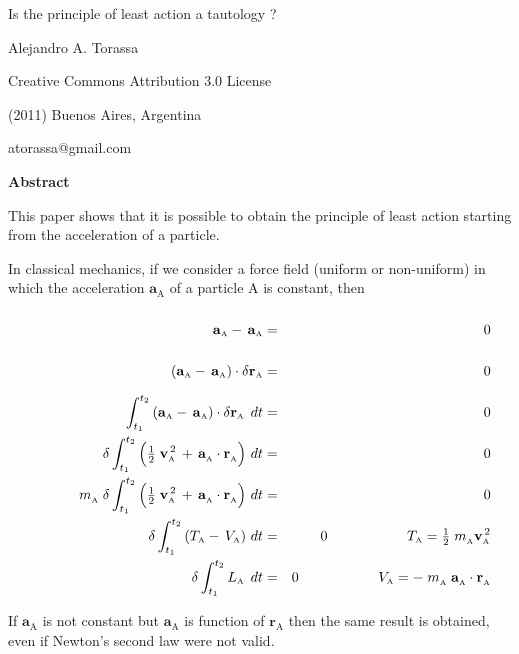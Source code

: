 \documentclass[12pt]{article}
\newcommand{\mM}{m}
\newcommand{\mT}{T}
\newcommand{\mV}{V}
\newcommand{\mL}{L}
\newcommand{\dos}{^{\,2}}
\newcommand{\vR}{\mathbf{r}}
\newcommand{\vV}{\mathbf{v}}
\newcommand{\vA}{\mathbf{a}}
\newcommand{\ep}{\hspace{+3.6em}}
\newcommand{\eq}{\hspace{+5.7em}}
\newcommand{\ra}{_{\scriptscriptstyle \mathrm A}}
\begin{document}
\begin{center}

{\fontsize{18}{18}\selectfont Is the principle of least action a tautology ?}

\bigskip \medskip

{\fontsize{12}{12}\selectfont Alejandro A. Torassa}

\bigskip \medskip

\footnotesize

Creative Commons Attribution 3.0 License

(2011) Buenos Aires, Argentina

atorassa@gmail.com

\bigskip \medskip

\small

{\bf Abstract}

\bigskip

\parbox{102mm}{This paper shows that it is possible to obtain the principle of least action starting from the acceleration of a particle.}

\end{center}

\normalsize

\bigskip \medskip

\noindent In classical mechanics, if we consider a force field (uniform or non-uniform) in which the acceleration $\vA\ra$ of a particle A is constant, then

\vspace{-0.6em}

\begin{eqnarray*}
\ep {\vphantom{\delta \int_{t_{1}}^{t_{2}}}} \vA\ra - \, \vA\ra & = & 0 \\
\ep {\vphantom{\delta \int_{t_{1}}^{t_{2}}}} \left( \vA\ra - \, \vA\ra \right) \cdot \delta \vR\ra & = & 0 \\
\ep \int_{t_{1}}^{t_{2}} \left( \vA\ra - \, \vA\ra \right) \cdot \delta \vR\ra \; \, dt & = & 0 \\
\ep \delta \int_{t_{1}}^{t_{2}} \left( {\textstyle \frac{1}{2}} \; \vV\ra\dos \, + \, \vA\ra^{\vphantom{\dos}} \cdot \vR\ra^{\vphantom{\dos}} \right) \, dt & = & 0 \\
\ep \mM\ra^{\vphantom{\dos}} \; \delta \int_{t_{1}}^{t_{2}} \left( {\textstyle \frac{1}{2}} \; \vV\ra\dos \, + \, \vA\ra^{\vphantom{\dos}} \cdot \vR\ra^{\vphantom{\dos}} \right) \, dt & = & 0 \\
\ep \delta \int_{t_{1}}^{t_{2}} \left( \mT\ra - \, \mV\ra \right) \, dt & = & 0 \eq \mT\ra = {\textstyle \frac{1}{2}} \; \mM\ra^{\vphantom{\dos}}\vV\ra\dos \\
\ep \delta \int_{t_{1}}^{t_{2}} \mL\ra \; \, dt & = & 0 \eq \mV\ra = - \; \mM\ra^{\vphantom{\dos}} \; \vA\ra^{\vphantom{\dos}} \cdot \vR\ra^{\vphantom{\dos}}
\end{eqnarray*}

\vspace{+1.2em}

\noindent If $\vA\ra$ is not constant but $\vA\ra$ is function of $\vR\ra$ then the same result is obtained, even if Newton's second law were not valid.
\end{document}

